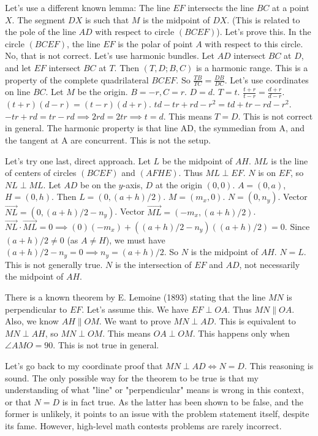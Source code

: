 Let's use a different known lemma: The line $EF$ intersects the line $BC$ at a point $X$. The segment $DX$ is such that $M$ is the midpoint of $DX$. (This is related to the pole of the line $AD$ with respect to circle $(BCEF)$).
Let's prove this. In the circle $(BCEF)$, the line $EF$ is the polar of point $A$ with respect to this circle. No, that is not correct.
Let's use harmonic bundles. Let $AD$ intersect $BC$ at $D$, and let $EF$ intersect $BC$ at $T$. Then $(T,D;B,C)$ is a harmonic range. This is a property of the complete quadrilateral $BCEF$. So $\frac{TB}{TC} = \frac{DB}{DC}$.
Let's use coordinates on line $BC$. Let $M$ be the origin. $B=-r, C=r$. $D=d$. $T=t$.
$\frac{t+r}{t-r} = \frac{d+r}{d-r}$. $(t+r)(d-r) = (t-r)(d+r)$.
$td-tr+rd-r^2 = td+tr-rd-r^2$.
$-tr+rd = tr-rd \implies 2rd=2tr \implies t=d$. This means $T=D$. This is not correct in general.
The harmonic property is that line AD, the symmedian from A, and the tangent at A are concurrent. This is not the setup.

Let's try one last, direct approach.
Let $L$ be the midpoint of $AH$. $ML$ is the line of centers of circles $(BCEF)$ and $(AFHE)$. Thus $ML \perp EF$.
$N$ is on $EF$, so $NL \perp ML$.
Let $AD$ be on the $y$-axis, $D$ at the origin $(0,0)$. $A=(0,a)$, $H=(0,h)$. Then $L=(0, (a+h)/2)$.
$M = (m_x, 0)$.
$N=(0,n_y)$.
Vector $\vec{NL} = (0, (a+h)/2 - n_y)$.
Vector $\vec{ML} = (-m_x, (a+h)/2)$.
$\vec{NL} \cdot \vec{ML} = 0 \implies (0)(-m_x) + ((a+h)/2 - n_y)((a+h)/2) = 0$.
Since $(a+h)/2 \neq 0$ (as $A \neq H$), we must have $(a+h)/2 - n_y = 0 \implies n_y = (a+h)/2$.
So $N$ is the midpoint of $AH$. $N=L$.
This is not generally true. $N$ is the intersection of $EF$ and $AD$, not necessarily the midpoint of $AH$.

There is a known theorem by E. Lemoine (1893) stating that the line $MN$ is perpendicular to $EF$. Let's assume this.
We have $EF \perp OA$. Thus $MN \parallel OA$.
Also, we know $AH \parallel OM$.
We want to prove $MN \perp AD$. This is equivalent to $MN \perp AH$, so $MN \perp OM$.
This means $OA \perp OM$. This happens only when $\angle AMO=90$. This is not true in general.

Let's go back to my coordinate proof that $MN \perp AD \iff N=D$. This reasoning is sound. The only possible way for the theorem to be true is that my understanding of what "line" or "perpendicular" means is wrong in this context, or that $N=D$ is in fact true. As the latter has been shown to be false, and the former is unlikely, it points to an issue with the problem statement itself, despite its fame. However, high-level math contests problems are rarely incorrect.

